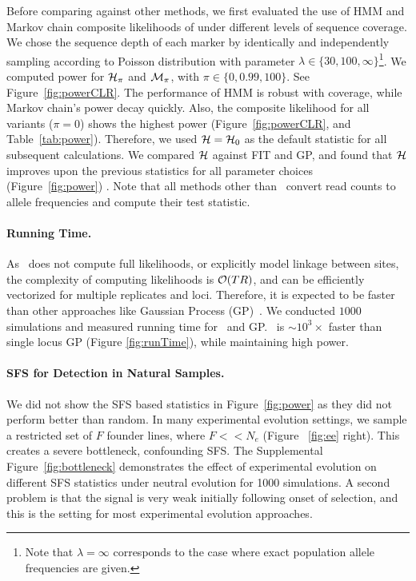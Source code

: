 \documentclass[11pt]{article}
\def\comale{\text{{\sc Comale}}}
\begin{document}
Before comparing against other methods, we first evaluated the use of
HMM and Markov chain composite likelihoods of under different levels
of sequence coverage. We chose the sequence depth of each marker by
identically and independently sampling according to Poisson
distribution with parameter $\lambda\in
\{30,100,\infty\}$\footnote{Note that $\lambda=\infty $ corresponds to
  the case where exact population allele frequencies are given.}. We
computed power for ${\cal H}_\pi$ and ${\cal M}_{\pi}$, with $\pi \in
\{0,0.99,100\}$. See Figure~\ref{fig:powerCLR}. The performance of HMM
is robust with coverage, while Markov chain's power decay
quickly. Also, the composite likelihood for all variants ($\pi=0$)
shows the highest power (Figure~\ref{fig:powerCLR}, and
Table~\ref{tab:power}).  Therefore, we used ${\cal H} = {\cal H}_0$ as
the default statistic for all subsequent calculations. We compared
${\cal H}$ against FIT and GP, and found that ${\cal H}$ improves upon the
previous statistics for all parameter choices (Figure~\ref{fig:power})
. Note that all methods other
than \comale\ convert read counts to allele frequencies and compute
their test statistic.


\paragraph{Running Time.}
As \comale\ does not compute full likelihoods, or explicitly model
linkage between sites, the complexity of computing likelihoods is
${\cal O}(TR)$, and can be efficiently vectorized for multiple replicates
and loci. Therefore, it is expected to be faster than other approaches
like Gaussian Process (GP)~\cite{Terhorst2015Multi}. We conducted
$1000$ simulations and measured running time for \comale\ and
GP. \comale\ is $\sim 10^3\times$ faster than single locus GP (Figure
\ref{fig:runTime}), while maintaining high power.


\paragraph{SFS for Detection in Natural Samples.} We did not show the
SFS based statistics in Figure~\ref{fig:power} as they did not perform
better than random. In many experimental evolution settings, we sample
a restricted set of $F$ founder lines, where $F<<N_e$ (Figure
~\ref{fig:ee} right). This creates a severe bottleneck, confounding
SFS. The Supplemental Figure~\ref{fig:bottleneck} demonstrates the
effect of experimental evolution on different SFS statistics under
neutral evolution for 1000 simulations. A second problem is that the
signal is very weak initially following onset of selection, and this
is the setting for most experimental evolution approaches.
\end{document}

